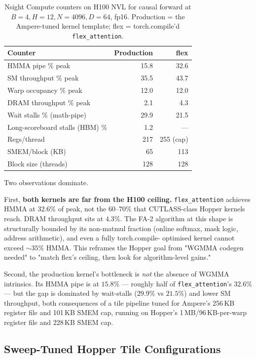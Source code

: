 \documentclass[10pt,twocolumn]{article}
\begin{document}
\begin{table}[H]
\centering\small
\begin{tabular}{lrr}
\toprule
\textbf{Counter} & \textbf{Production} & \textbf{flex} \\
\midrule
HMMA pipe \% peak                & 15.8 & 32.6 \\
SM throughput \% peak            & 35.5 & 43.7 \\
Warp occupancy \% peak           & 12.0 & 12.0 \\
DRAM throughput \% peak          &  2.1 &  4.3 \\
Wait stalls \% (math-pipe)       & 29.9 & 21.5 \\
Long-scoreboard stalls (HBM) \%  &  1.2 &  --- \\
Regs/thread                      & 217  & 255 (cap) \\
SMEM/block (KB)                  & 65   & 113 \\
Block size (threads)             & 128  & 128 \\
\bottomrule
\end{tabular}
\caption{Nsight Compute counters on H100 NVL for causal forward at
$B{=}4, H{=}12, N{=}4096, D{=}64$, fp16. Production = the
Ampere-tuned kernel template; flex = torch.compile'd
\texttt{flex\_attention}.}
\label{tab:ncu_initial}
\end{table}

Two observations dominate.

First, \textbf{both kernels are far from the H100 ceiling.}
\texttt{flex\_attention} achieves HMMA at $32.6\%$ of peak, not the
$60$--$70\%$ that CUTLASS-class Hopper kernels reach. DRAM
throughput sits at $4.3\%$. The FA-2 algorithm at this shape is
structurally bounded by its non-matmul fraction (online softmax,
mask logic, address arithmetic), and even a fully torch.compile-
optimised kernel cannot exceed $\sim 35\%$ HMMA. This reframes the
Hopper goal from "WGMMA codegen needed" to "match flex's ceiling,
then look for algorithm-level gains."

Second, the production kernel's bottleneck is \emph{not} the
absence of WGMMA intrinsics. Its HMMA pipe is at $15.8\%$ ---
roughly half of \texttt{flex\_attention}'s $32.6\%$ --- but the
gap is dominated by wait-stalls ($29.9\%$ vs $21.5\%$) and lower
SM throughput, both consequences of a tile pipeline tuned for
Ampere's 256\,KB register file and 101\,KB SMEM cap, running on
Hopper's 1\,MB/96\,KB-per-warp register file and 228\,KB SMEM cap.

\subsection{Sweep-Tuned Hopper Tile Configurations}
\label{sec:hopper_sweep}
\end{document}
